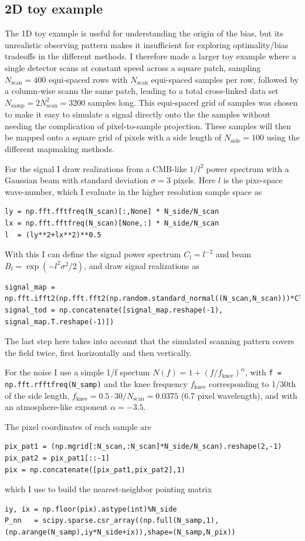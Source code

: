 \documentclass[twocolumn,apj]{aastex63}
\begin{document}
\subsection{2D toy example}
The 1D toy example is useful for understanding the origin of the bias, but
its unrealistic observing pattern makes it insufficient for exploring
optimality/bias tradeoffs in the different methods. I therefore made a larger
toy example where a single detector scans at constant speed across a square
patch, sampling $N_\text{scan} = 400$ equi-spaced rows with $N_\text{scan}$
equi-spaced samples per row, followed by a column-wise scann the same patch,
leading to a total cross-linked data set $N_\text{samp} = 2 N_\text{scan}^2 = 3200$
samples long. This equi-spaced grid of samples was chosen to make it easy to
simulate a signal directly onto the the samples without needing the complication
of pixel-to-sample projection. These samples will then be mapped onto a
square grid of pixels with a side length of $N_\text{side} = 100$ using
the different mapmaking methods.

For the signal I draw realizations from a CMB-like $1/l^2$ power spectrum
with a Gaussian beam with standard deviation $\sigma=3$ pixels. Here $l$
is the pixe-space wave-number, which I evaluate in the higher
resolution sample space as
\begin{lstlisting}
ly = np.fft.fftfreq(N_scan)[:,None] * N_side/N_scan
lx = np.fft.fftfreq(N_scan)[None,:] * N_side/N_scan
l  = (ly**2+lx**2)**0.5
\end{lstlisting}
With this I can define the signal power spectrum $C_l = l^{-2}$ and beam $B_l = \exp(-l^2 \sigma^2/2)$,
and draw signal realizations as
\begin{lstlisting}
signal_map = np.fft.ifft2(np.fft.fft2(np.random.standard_normal((N_scan,N_scan)))*Cl**0.5*Bl).real
signal_tod = np.concatenate([signal_map.reshape(-1), signal_map.T.reshape(-1)])
\end{lstlisting}
The last step here takes into account that the simulated scanning pattern covers the
field twice, first horizontally and then vertically.

For the noise I use a simple 1/f spectum $N(f) = 1 + (f/f_\text{knee})^\alpha$,
with \lstinline{f = np.fft.rfftfreq(N_samp)}
and the knee frequency $f_\text{knee}$ corresponding to 1/30th of the side length,
$f_\text{knee} = 0.5\cdot 30/N_\text{scan} = 0.0375$ (6.7 pixel wavelength), and with
an atmosphere-like exponent $\alpha=-3.5$.

The pixel coordinates of each sample are
\begin{lstlisting}
pix_pat1 = (np.mgrid[:N_scan,:N_scan]*N_side/N_scan).reshape(2,-1)
pix_pat2 = pix_pat1[::-1]
pix = np.concatenate([pix_pat1,pix_pat2],1)
\end{lstlisting}
which I use to build the nearest-neighbor pointing matrix
\begin{lstlisting}
iy, ix = np.floor(pix).astype(int)%N_side
P_nn   = scipy.sparse.csr_array((np.full(N_samp,1),(np.arange(N_samp),iy*N_side+ix)),shape=(N_samp,N_pix))
\end{lstlisting}
\end{document}
